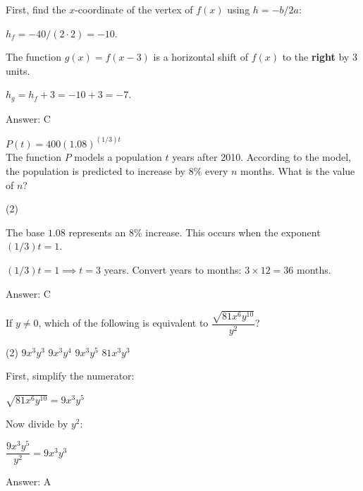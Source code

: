 \documentclass[11pt,paper=a4,answers]{exam}
\begin{document}
\begin{questions}
\begin{solution}
First, find the $x$-coordinate of the vertex of $f(x)$ using $h = -b/2a$:
\vspace{5pt}
\begin{center}
$h_f = -40 / (2 \cdot 2) = -10$.
\end{center}
\vspace{5pt}
The function $g(x) = f(x - 3)$ is a horizontal shift of $f(x)$ to the \textbf{right} by $3$ units.
\vspace{5pt}
\begin{center}
$h_g = h_f + 3 = -10 + 3 = -7$.
\end{center}
\vspace{5pt}
Answer: \colorbox{yellow!100}{C}
\end{solution}

\vspace{1cm}

\question
$P(t) = 400(1.08)^{(1/3)t}$ \\
The function $P$ models a population $t$ years after 2010. According to the model, the population is predicted to increase by $8\%$ every $n$ months. What is the value of $n$?
\begin{tasks}(2)
       
\end{tasks}

\begin{solution}
The base $1.08$ represents an $8\%$ increase. This occurs when the exponent $(1/3)t = 1$.
\vspace{5pt}
\begin{center}
$(1/3)t = 1 \implies t = 3$ years.
\vspace{5pt}
Convert years to months: $3 \times 12 = 36$ months.
\end{center}
\vspace{5pt}
Answer: \colorbox{yellow!100}{C}
\end{solution}

\vspace{1cm}

\question
If $y \neq 0$, which of the following is equivalent to $\dfrac{\sqrt{81x^6y^{10}}}{y^2}$?
\begin{tasks}(2)
    \task $9x^3y^3$ \task $9x^3y^4$ \task $9x^3y^5$ \task $81x^3y^3$
\end{tasks}

\begin{solution}
First, simplify the numerator:
\vspace{5pt}
\begin{center}
$\sqrt{81x^6y^{10}} = 9x^3y^5$
\end{center}
\vspace{5pt}
Now divide by $y^2$:
\vspace{5pt}
\begin{center}
$\dfrac{9x^3y^5}{y^2} = 9x^3y^3$
\end{center}
\vspace{5pt}
Answer: \colorbox{yellow!100}{A}
\end{solution}


\end{questions}
\end{document}

